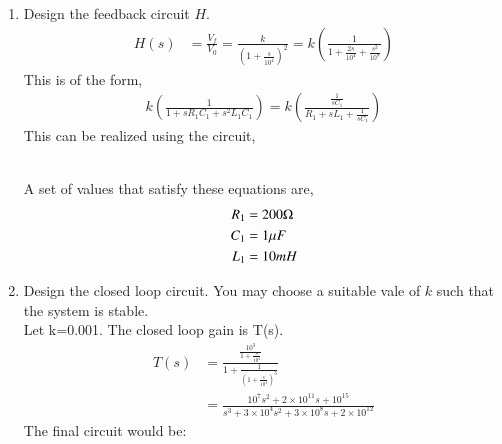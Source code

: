 \begin{enumerate}[label=\arabic*.,ref=\theenumi]
\item Design the feedback circuit $H$. \\
\solution
\begin{align}
H(s)&=\frac{V_f}{V_0}= \frac{k}{\left(1+\frac{s}{10^4}\right)^2} = k\left({\frac{1}{1+\frac{2s}{10^4}+\frac{s^2}{10^8}}}\right)  
\end{align}
This is of the form,
\begin{align}
k\left(\frac{1}{1+s{R_1}{C_1}+{s^2}{L_1}{C_1}}\right) =  k\left(\frac{\frac{1}{s{C_1}}}{{R_1}+s{L_1}+\frac{1}{s{C_1}}}\right)  
\end{align}
This can be realized using the circuit,
\begin{figure}[!ht]
	\begin{center}
		\resizebox{\columnwidth}{!}{}
	\end{center}
\caption{}
\label{fig:ee18btech11006_2}
\end{figure} \\
A set of values that satisfy these equations are,
\begin{align}
R_1&= 200\ohm \\
C_1&= 1\mu F\\
L_1&= 10mH 
\end{align}
\item Design the closed loop circuit.  You may choose a suitable vale of $k$ such that the system is stable.\\
\solution Let k=0.001. The closed loop gain is T(s).
\begin{align}
    T(s)&=\frac{\frac{10^3}{1+\frac{s}{10^4}}}{1+\frac{1}{\left(1+\frac{s}{10^4}\right)^3}}\\
    &=\frac{10^7s^2+2\times10^{11}s+10^{15}}{s^3+3\times10^4s^2+3\times10^8s+2\times10^{12}}
\end{align}
The final circuit would be:
\begin{figure}[!ht]
	\begin{center}
		\resizebox{\columnwidth}{!}{}
	\end{center}
\caption{}
\label{fig:ee18btech11006_6}

\end{figure}
\end{enumerate}
